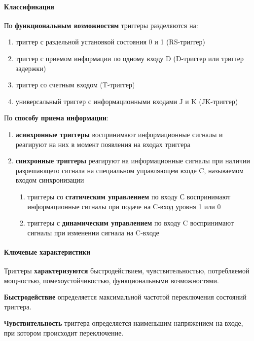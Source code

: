 \documentclass{article}
\begin{document}
\begin{flushleft}
\paragraph{Классификация}

По \textbf{функциональным возможностям} триггеры разделяются на:

\begin{enumerate}
    \item триггер с раздельной установкой состояния 0 и 1 (RS-триггер)
    \item триггер с приемом информации по одному входу D (D-триггер или триггер задержки)
    \item триггер со счетным входом (T-триггер)
    \item универсальный триггер с информационными входами J и K (JK-триггер)
\end{enumerate}

По \textbf{способу приема информации}:

\begin{enumerate}
    \item \textbf{асинхронные триггеры} воспринимают информационные сигналы и реагируют на них в момент появления на входах триггера
    \item \textbf{синхронные триггеры} реагируют на информационные сигналы при наличии разрешающего сигнала на специальном управляющем входе C, называемом входом синхронизации
    \begin{enumerate}
        \item триггеры со \textbf{статическим управлением} по входу С воспринимают информационные сигналы при подаче на C-вход уровня 1 или 0
        \item триггеры с \textbf{динамическим управлением} по входу C воспринимают сигналы при изменении сигнала на C-входе
    \end{enumerate}
\end{enumerate}

\paragraph{Ключевые характеристики}

Триггеры \textbf{характеризуются} быстродействием, чувствительностью, потребляемой мощностью, помехоустойчивостью, функциональными возможностями.

\textbf{Быстродействие} определяется максимальной частотой переключения состояний триггера.

\textbf{Чувствительность} триггера определяется наименьшим напряжением на входе, при котором происходит переключение.


\end{flushleft}
\end{document}
